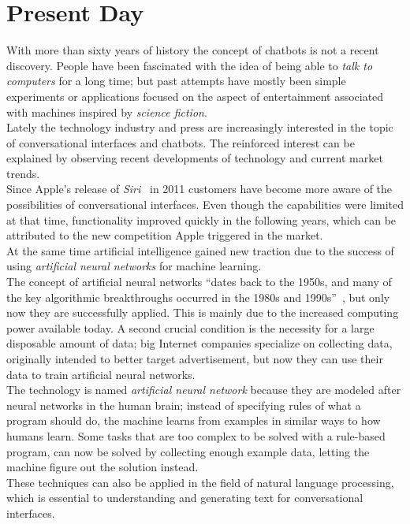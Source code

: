 \section{Present Day}
\label{presentday}


With more than sixty years of history the concept of chatbots is not a recent discovery.
People have been fascinated with the idea of being able to \emph{talk to computers} for a long time;
but past attempts have mostly been simple experiments or applications focused on the aspect of entertainment associated with machines inspired by \emph{science fiction}.
\\

Lately the technology industry and press are increasingly interested in the topic of conversational interfaces and chatbots.
The reinforced interest can be explained by observing recent developments of technology and current market trends.
\\

Since Apple's release of \emph{Siri}~\cite{iphonelaunch} in 2011 customers have become more aware of the possibilities of conversational interfaces.
Even though the capabilities were limited at that time,
functionality improved quickly in the following years,
which can be attributed to the new competition Apple triggered in the market.
\\

At the same time artificial intelligence gained new traction due to the success of using \emph{artificial neural networks} for machine learning.
\\

The concept of artificial neural networks ``dates back to the 1950s, and many of the key algorithmic breakthroughs occurred in the 1980s and 1990s''~\cite{airevolution},
but only now they are successfully applied.
This is mainly due to the increased computing power available today.
A second crucial condition is the necessity for a large disposable amount of data;
big Internet companies specialize on collecting data, originally intended to better target advertisement,
but now they can use their data to train artificial neural networks.
\\
The technology is named \emph{artificial neural network} because they are modeled after neural networks in the human brain;
instead of specifying rules of what a program should do, the machine learns from examples in similar ways to how humans learn.
Some tasks that are too complex to be solved with a rule-based program, can now be solved by collecting enough example data,
letting the machine figure out the solution instead.
\\
These techniques can also be applied in the field of natural language processing,
which is essential to understanding and generating text for conversational interfaces.
\\

